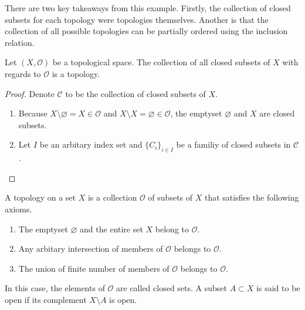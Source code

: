There are two key takeaways from this example. Firstly, the collection of closed subsets for each topology were topologies themselves. Another is that the collection of all possible topologies can be partially ordered using the inclusion relation.
%
\begin{thmbox}
    \begin{proposition}
        Let \((X, \mathcal{O})\) be a topological space. The collection of all closed subsets of \(X\) with regards to \(\mathcal{O}\) is a topology.
    \end{proposition}
\end{thmbox}
%
\begin{proof}
    Denote \(\mathcal{C}\) to be the collection of closed subsets of \(X\).
    \begin{enumerate}
        \item Because \(X \setminus \varnothing = X \in \mathcal{O}\) and \(X \setminus X = \varnothing \in \mathcal{O}\), the emptyset \(\varnothing\) and \(X\) are closed subsets.
        \item Let \(I\) be an arbitary index set and \(\{C_i\}_{i \in I}\) be a familiy of closed subsets in \(\mathcal{C}\).
    \end{enumerate}
\end{proof}
%
\begin{defboxlight}
    \begin{definition}
        A topology on a set \(X\) is a collection \(\mathcal{O}\) of subsets of \(X\) that satisfies the following axioms.
        \begin{enumerate}
            \item The emptyset \(\varnothing\) and the entire set \(X\) belong to \(\mathcal{O}\).
            \item Any arbitary intersection of members of \(\mathcal{O}\) belongs to \(\mathcal{O}\).
            \item The union of finite number of members of \(\mathcal{O}\) belongs to \(\mathcal{O}\).
        \end{enumerate}
        In this case, the elements of \(\mathcal{O}\) are called closed sets. A subset \(A \subset X\) is said to be open if its complement \(X \setminus A\) is open.
    \end{definition}
\end{defboxlight}
%
\begin{defboxlight}
    \begin{definition}
        
    \end{definition}
\end{defboxlight}
